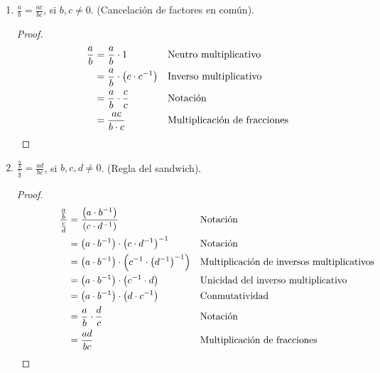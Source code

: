 \documentclass[11pt]{article}
\begin{document}
\begin{enumerate}[label=\alph*)]
    \item $\frac{a}{b} = \frac{ac}{bc}$, si $b,c \neq 0$. (Cancelación de factores en común).
    \vspace{-1em}
    \begin{proof} 
    \begin{align*}
    \frac{a}{b}&=\frac{a}{b}\cdot 1 && \text{Neutro multiplicativo}\\
    &= \frac{a}{b}\cdot \bigl(c \cdot c^{-1}\bigr) && \text{Inverso multiplicativo}\\
    &= \frac{a}{b} \cdot \frac{c}{c} && \text{Notación}\\
    &= \frac{ac}{b\cdot c} && \text{Multiplicación de fracciones} \qedhere
    \end{align*}
    \end{proof} \vspace{-1em}
    
    \item $\frac{\frac{a}{b}}{\frac{c}{d}} = \frac{ad}{bc}$, si $b, c, d \neq 0$. (Regla del sandwich).
    \vspace{-1em}\begin{proof} 
    \begin{align*} \qquad \ \qquad
    \frac{\frac{a}{b}}{\frac{c}{d}} &= \frac{\left( a \cdot b^{-1} \right)}{\left( c \cdot d^{-1} \right)} && \text{Notación}\\
    &= \left( a \cdot b^{-1} \right) \cdot \left( c \cdot d^{-1} \right)^{-1} && \text{Notación}\\
    &= \left( a \cdot b^{-1} \right) \cdot \left( c^{-1} \cdot \left( d^{-1} \right) ^{-1} \right) && \text{Multiplicación de inversos multiplicativos}\\
    &= \left( a \cdot b^{-1} \right) \cdot \left( c^{-1} \cdot d \right) && \text{Unicidad del inverso multiplicativo}\\
    &= \left( a \cdot b^{-1} \right) \cdot \left( d \cdot c^{-1} \right) && \text{Conmutatividad}\\
    &= \frac{a}{b} \cdot \frac{d}{c} && \text{Notación}\\
    &= \frac{ad}{bc} && \text{Multiplicación de fracciones} \qedhere
    \end{align*}     
    \end{proof} \vspace{-1em}


\end{enumerate}
\end{document}

